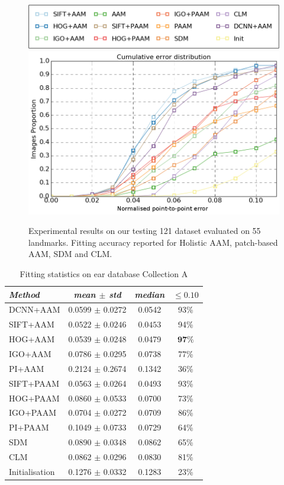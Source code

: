 \begin{figure}
    \centering
    \includegraphics[width=\columnwidth]{resources/Ear_Deformable_Model/benchmark_ear_legend} \\
    \includegraphics[width=\columnwidth]{resources/Ear_Deformable_Model/benchmark_ear}
    \caption{Experimental results on our testing 121 dataset evaluated on 55 landmarks. Fitting accuracy reported for Holistic AAM, patch-based AAM, SDM and CLM.}
    \label{fig:fitting_results}
\end{figure}

\begin{table}
\small
\centering
\begin{tabular}{|l|c|c|c|}
\hline
\emph{Method}   & \emph{mean $\pm$ std} & \emph{median} & $\leq 0.10$\\
\hline\hline
DCNN+AAM & 0.0599 $\pm$ 0.0272  & 0.0542 & 93\%\\
SIFT+AAM & $\bm{0.0522}$ $\pm$ $\bm{0.0246}$  & $\bm{0.0453}$ & 94\%\\
HOG+AAM & 0.0539 $\pm$ 0.0248  & 0.0479 & $\bm{97\%}$ \\
IGO+AAM & 0.0786 $\pm$ 0.0295  & 0.0738 & 77\%\\
PI+AAM & 0.2124 $\pm$ 0.2674  & 0.1342 & 36\%\\
\hline
SIFT+PAAM & 0.0563 $\pm$ 0.0264  & 0.0493 & 93\%\\
HOG+PAAM & 0.0860 $\pm$ 0.0533  & 0.0700 & 73\%\\
IGO+PAAM & 0.0704 $\pm$ 0.0272  & 0.0709 & 86\%\\
PI+PAAM & 0.1049 $\pm$ 0.0733  & 0.0729 & 64\%\\
\hline
SDM & 0.0890 $\pm$ 0.0348  & 0.0862 & 65\%\\
CLM & 0.0862 $\pm$ 0.0296  & 0.0830 & 81\%\\
\hline
Initialisation & 0.1276 $\pm$ 0.0332  & 0.1283 & 23\%\\
\hline
\end{tabular}
\caption{Fitting statistics on ear database Collection A}
\label{tab:ear_stats}
\end{table}


